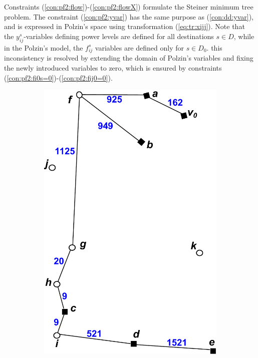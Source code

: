     Constraints (\ref{con:pf2:flow})-(\ref{con:pf2:flowX}) formulate the Steiner minimum tree problem. The constraint (\ref{con:pf2:yvar}) has the same purpose as (\ref{con:dd:yvar}), and is expressed in Polzin's space using transformation (\ref{eq:tr:xijj}). Note that the $y_{ij}^s$-variables defining power levels are defined for all destinations $s\in D$, while in the Polzin's model, the $f_{ij}^s$ variables are defined only for $s\in D_0$. this inconsistency is resolved by extending the domain of Polzin's variables and fixing the newly introduced variables to zero, which is ensured by constraints (\ref{con:pf2:fi0s=0})-(\ref{con:pf2:fij0=0}).
\begin{figure}[!htb]
    \centering
    \begin{subfigure}[b]{0.4\textwidth}
        \includegraphics[width=\textwidth]{conBNec}

\end{subfigure}
\end{figure}
